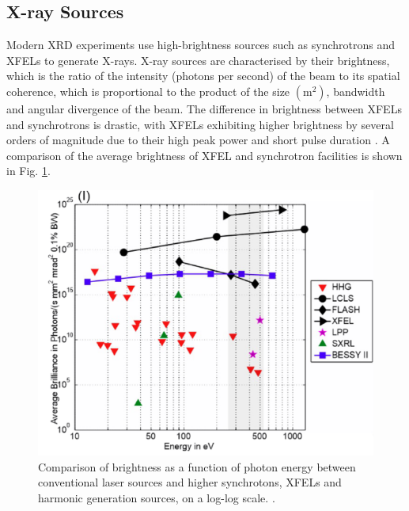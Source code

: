 \documentclass[aps,prb,twocolumn,superscriptaddress]{revtex4-2}
\begin{document}
\subsection{X-ray Sources}
Modern XRD experiments use high-brightness sources such as synchrotrons and
XFELs to generate X-rays. X-ray sources are characterised by their brightness,
which is the ratio of the intensity (photons per second) of the beam to its
spatial coherence, which is proportional to the product of the size
$(\text{m}^2)$, bandwidth and angular divergence of the beam.  The difference in
brightness between XFELs and synchrotrons is drastic, with XFELs exhibiting
higher brightness by several orders of magnitude due to their high peak power
and short pulse duration \cite{Baillet2014}. A comparison of the average
brightness of XFEL and synchrotron facilities is shown in Fig.
\ref{fig:brilliance}.

\begin{figure}[h]
    \centering
    \includegraphics[width=0.9\linewidth]{Figures/XRaySourceBrilliance.png}
    \caption{Comparison of brightness as a function of 
        photon energy between conventional laser sources and higher 
        synchrotons, XFELs and harmonic generation sources, on a log-log scale. 
        \cite{Boutet2018}.
    }
    \label{fig:brilliance}
\end{figure}
\end{document}
